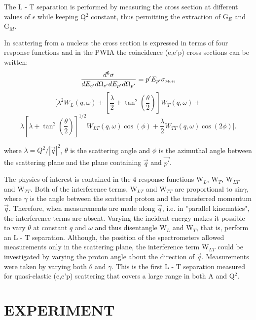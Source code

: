 \documentclass[aps,prl,twocolumn,showpacs,amsmath,amssymb,floats]{revtex4}
\begin{document}
The L - T separation is performed by measuring the cross section at different 
values of $\epsilon$ while keeping Q$^2$ constant, thus permitting the 
extraction of G$_E$  and  G$_M$.

In scattering from a nucleus the cross section is expressed in terms of 
four response functions and in the PWIA the coincidence 
(e,e'p) cross sections can be written:
$$
\frac{d^6\sigma}{dE_{e'}d\Omega_{e'}dE_{p'}d\Omega_{p'}}= p'E_{p'}\sigma_
{\mbox{\tiny Mott}}$$
$$
[\lambda^{2}W_{L}(q,\omega) + [\frac{\lambda}{2}+ \tan^{2}(\frac{\theta}{2})]W_{
T}(q,\omega)+
$$
\begin{equation}
\label{cc2}
\lambda[\lambda + \tan^{2}(\frac{\theta}{2})]^{1/2}W_{LT}(q,\omega)\cos(\phi) + 
\frac{\lambda}{2}W_{TT}(q,\omega)\cos(2\phi)].
\end{equation}
 
\noindent
where $\lambda =Q^2/|\vec{q}|^2$, $\theta$  is the scattering angle and $\phi$  
is the azimuthal angle between the scattering plane and the  plane containing 
$\vec{q}$ and $\vec{p'}$.

The physics of interest is contained in the 4 response functions W$_L$, W$_T$, 
W$_{LT}$ and W$_{TT}$.  Both of the interference terms, W$_{LT}$ and W$_{TT}$ 
are proportional to sin$\gamma$, where $\gamma$  is the angle between the 
scattered proton and the transferred momentum $\vec{q}$.  Therefore, when 
measurements are made along $\vec{q}$, i.e. in "parallel kinematics", the 
interference terms are absent.  Varying the incident energy makes it possible to 
vary $\theta$ at constant $q$ and $\omega$ and thus disentangle W$_L$ and W$_T$, 
that is, perform an L - T separation.  Although, the position of the 
spectrometers allowed measurements only in the scattering plane, the 
interference term W$_{LT}$ could be investigated by varying the proton angle 
about the direction of  $\vec{q}$. Measurements were taken by varying both 
$\theta$ and $\gamma$.  This is the first L - T separation measured for quasi-elastic (e,e'p) scattering that covers a large 
range in both A and Q$^2$.


\section*{EXPERIMENT}
\end{document}
